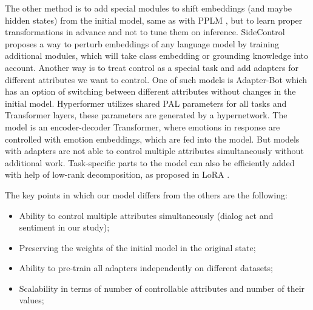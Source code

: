 \documentclass[11pt]{article}
\begin{document}
The other method is to add special modules to shift embeddings (and maybe hidden states) from the initial model, same as with PPLM \cite{pplm}, but to learn proper transformations in advance and not to tune them on inference. SideControl \cite{side_control} proposes a way to perturb embeddings of any language model by training additional modules, which will take class embedding or grounding knowledge into account. Another way is to treat control as a special task and add adapters \cite{houlsby2019parameterefficient} for different attributes we want to control. One of such models is Adapter-Bot \cite{madotto2020adapterbot} which has an option of switching between different attributes without changes in the initial model. Hyperformer \cite{mahabadi2021parameter} utilizes shared PAL parameters for all tasks and Transformer layers, these parameters are generated by a hypernetwork. The model \cite{xie2021empathetic} is an encoder-decoder Transformer, where emotions in response are controlled with emotion embeddings, which are fed into the model. But models with adapters are not able to control multiple attributes simultaneously without additional work. Task-specific parts to the model can also be efficiently added with help of low-rank decomposition, as proposed in LoRA \cite{lora}.

The key points in which our model differs from the others are the following:

\begin{itemize}
    \item Ability to control multiple attributes simultaneously (dialog act and sentiment in our study);
    \item Preserving the weights of the initial model in the original state;
    \item Ability to pre-train all adapters independently on different datasets;
    \item Scalability in terms of number of controllable attributes and number of their values;
\end{itemize}
\end{document}
